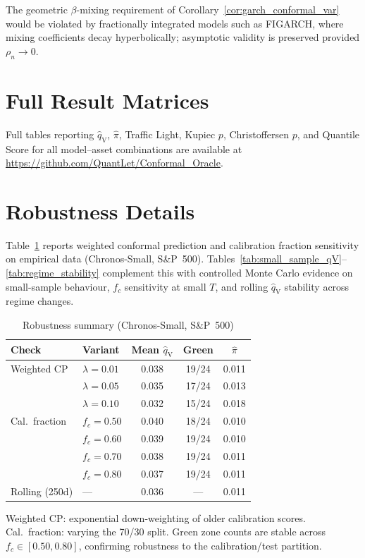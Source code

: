 \documentclass[preprint,11pt,authoryear]{elsarticle}
\newcommand{\1}{\boldsymbol{1}}
\newcommand{\qV}{\hat{q}_{\scriptscriptstyle\mathrm{V}}}
\begin{document}
	The geometric $\beta$-mixing requirement of Corollary~\ref{cor:garch_conformal_var} would be violated by fractionally integrated models such as FIGARCH, where mixing coefficients decay hyperbolically; asymptotic validity is preserved provided $\rho_n \to 0$.
	
	
	\section{Full Result Matrices}
	\label{app:full_results}
	
	Full tables reporting $\qV$, $\hat\pi$, Traffic Light, Kupiec $p$, Christoffersen $p$, and Quantile Score for all model--asset combinations are available at \url{https://github.com/QuantLet/Conformal_Oracle}.
	
	
	\section{Robustness Details}
	\label{app:robustness}
	
	Table~\ref{tab:robustness} reports weighted conformal prediction
	and calibration fraction sensitivity on empirical data
	(Chronos-Small, S\&P~500). Tables~\ref{tab:small_sample_qV}--\ref{tab:regime_stability}
	complement this with controlled Monte Carlo evidence on
	small-sample behaviour, $f_c$ sensitivity at small $T$, and
	rolling $\qV$ stability across regime changes.
	
	\begin{table}[H]
		\centering
		\caption{Robustness summary (Chronos-Small, S\&P~500)}
		\label{tab:robustness}
		\footnotesize
		\begin{tabular}{@{}llccc@{}}
			\toprule
			Check & Variant & Mean $\qV$ & Green & $\hat\pi$ \\
			\midrule
			Weighted CP     & $\lambda=0.01$  & 0.038 & 19/24 & 0.011 \\
			& $\lambda=0.05$  & 0.035 & 17/24 & 0.013 \\
			& $\lambda=0.10$  & 0.032 & 15/24 & 0.018 \\
			\midrule
			Cal.\ fraction  & $f_c=0.50$      & 0.040 & 18/24 & 0.010 \\
			& $f_c=0.60$      & 0.039 & 19/24 & 0.010 \\
			& $f_c=0.70$      & 0.038 & 19/24 & 0.011 \\
			& $f_c=0.80$      & 0.037 & 19/24 & 0.011 \\
			\midrule
			Rolling (250d)  & ---             & 0.036 & --- & 0.011 \\
			\bottomrule
		\end{tabular}
		\begin{minipage}{\linewidth}\footnotesize
			\smallskip
			Weighted CP: exponential down-weighting of older calibration scores. Cal.\ fraction: varying the 70/30 split. Green zone counts are stable across $f_c \in [0.50, 0.80]$, confirming robustness to the calibration/test partition.
		\end{minipage}
	\end{table}
	
\end{document}
